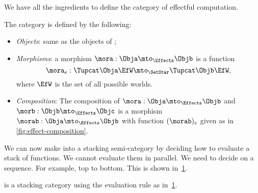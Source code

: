 We have all the ingredients to define the category \Effects of effectful computation.

\begin{definition}[\Effects]
    The \Effects category is defined by the following:
    \begin{itemize}
        \item \emph{Objects}: same as the objects of \SetStar;
        \item \emph{Morphisms}: a morphism $\mora: \Obja \mto_{\Effects} \Objb$ is a function
              \begin{equation}
                  \mora_e: \Tupcat \Obja \EfW \mto_{\SetStar} \Tupcat \Objb \EfW,
              \end{equation}
              where $\EfW$ is the set of all possible worlds.
        \item \emph{Composition}: The composition of  $\mora: \Obja \mto_{\Effects} \Objb$ and
              $\morb: \Objb \mto_{\Effects} \Objc$ is a morphism $\morab: \Obja \mto_{\Effects} \Objb$ with function $(\morab)_e$ given as in \cref{fig:effect-composition}.
    \end{itemize}
\end{definition}

We can now make \Effects into a stacking semi-category by deciding how to evaluate a stack of functions.
We cannot evaluate them in parallel.
We need to decide on a sequence.
For example, top to bottom.
This is shown in~\cref{fig:effect-stacking}.

\begin{figure}[h]
    \caption{}
    \label{fig:effect-stacking}
\end{figure}

\begin{lemma}
    \Effects is a stacking category using the evaluation rule as in~\cref{fig:effect-stacking}.
\end{lemma}
